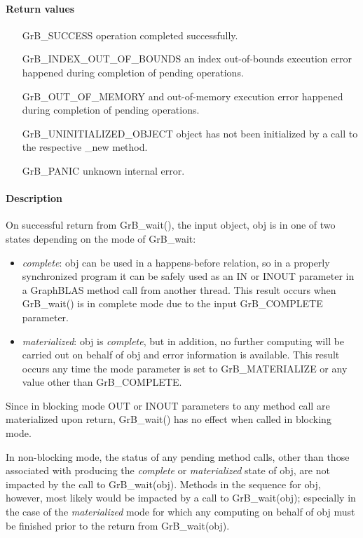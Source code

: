 \paragraph{Return values}
\begin{itemize}[leftmargin=2.3in]
	\item[{\sf GrB\_SUCCESS}]			operation completed successfully.
	\item[{\sf GrB\_INDEX\_OUT\_OF\_BOUNDS}]	an index out-of-bounds execution error happened during completion of pending operations.
	\item[{\sf GrB\_OUT\_OF\_MEMORY}]		and out-of-memory execution error happened during completion of pending operations.
	\item[{\sf GrB\_UNINITIALIZED\_OBJECT}]		object has not been initialized by a call to the respective {\sf *\_new} method.
	\item[{\sf GrB\_PANIC}]				unknown internal error.
\end{itemize}

\paragraph{Description}

On successful return from {\sf GrB\_wait()}, the input object, {\sf obj} is in one of two states depending on the mode of {GrB\_wait}: 
\begin{itemize}
\item \emph{complete}:  {\sf obj} can be used in a happens-before relation, so in a properly synchronized
program it can be safely used as an {\sf IN} or {\sf INOUT} parameter in a
GraphBLAS method call from another thread.  This result occurs when {GrB\_wait()} is in complete mode
due to the input {GrB\_COMPLETE} parameter.

\item \emph{materialized}:  {\sf obj} is \emph{complete}, but in addition, no further computing will be 
carried out on behalf of {\sf obj} and error information is available.   This result
occurs any time the mode parameter is set to {\sf GrB\_MATERIALIZE} or any value other than
{GrB\_COMPLETE}.
\end{itemize} 
Since in blocking mode {\sf OUT} or {\sf INOUT} parameters to any method call
are materialized upon return, {\sf GrB\_wait()} has no effect when called in blocking mode. 

In non-blocking mode, the status of any pending method calls, other than those associated with producing the
\emph{complete} or \emph{materialized} state of {\sf obj}, are not impacted by the call to {\sf GrB\_wait(obj)}.
Methods in the sequence for {\sf obj}, however, most likely would be impacted by a call to
{\sf GrB\_wait(obj)}; especially in the case of the \emph{materialized} mode for which any computing 
on behalf of {\sf obj} must be finished prior to the return from {\sf GrB\_wait(obj)}.  


